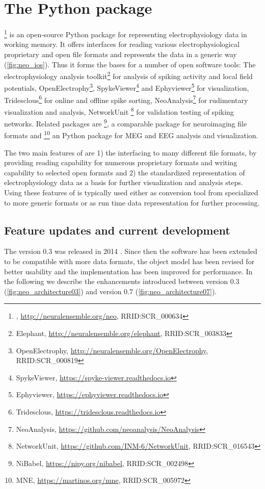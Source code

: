 \section{The  Python package}
\footnote{, \url{http://neuralensemble.org/neo}, RRID:SCR\_000634} \citep{Garcia_2014} is an open-source Python package for representing electrophysiology data in working memory. It offers interfaces for reading various electrophysiological proprietary and open file formats and represents the data in a generic way (\cref{fig:neo_ios}). Thus it forms the bases for a number of open software tools: The electrophysiology analysis toolkit\footnote{Elephant, \url{http://neuralensemble.org/elephant}, RRID:SCR\_003833} for analysis of spiking activity and local field potentials, OpenElectrophy\footnote{OpenElectrophy, \url{http://neuralensemble.org/OpenElectrophy}, RRID:SCR\_000819}, SpykeViewer\footnote{SpykeViewer, \url{https://spyke-viewer.readthedocs.io}} and Ephyviewer\footnote{Ephyviewer, \url{https://ephyviewer.readthedocs.io}} for visualization, Tridesclous\footnote{Tridesclous, \url{https://tridesclous.readthedocs.io}} for online and offline spike sorting, NeoAnalysis\footnote{NeoAnalysis, \url{https://github.com/neoanalysis/NeoAnalysis}} \citep{Zhang_2017} for rudimentary visualization and analysis, NetworkUnit \footnote{NetworkUnit, \url{https://github.com/INM-6/NetworkUnit}, RRID:SCR\_016543} for validation testing of spiking networks. Related packages are \footnote{NiBabel, \url{https://nipy.org/nibabel}, RRID:SCR\_002498}, a comparable package for neuroimaging file formats and \footnote{MNE, \url{https://martinos.org/mne}, RRID:SCR\_005972} an Python package for MEG and EEG analysis and visualization.

The two main features of  are 1) the interfacing to many different file formats, by providing reading capability for numerous proprietary formats and writing capability to selected open formats and 2) the standardized representation of electrophysiology data as a basis for further visualization and analysis steps. Using these features of  is typically used either as conversion tool from specialized to more generic formats or as run time data representation for further processing.

\subsection{Feature updates and current development}
The  version 0.3 was released in 2014 \citep{Garcia_2014}. Since then the software has been extended to be compatible with more data formats, the object model has been revised for better usability and the implementation has been improved for performance. In the following we describe the enhancements introduced between version 0.3 (\cref{fig:neo_architecture03}) and version 0.7 (\cref{fig:neo_architecture07}).

